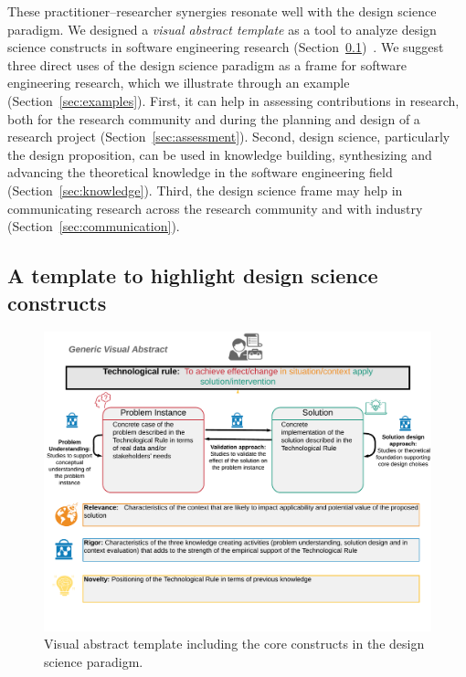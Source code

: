 \documentclass[graybox]{svmult}
\begin{document}
These practitioner--researcher synergies resonate well with the design science paradigm.  We designed a \emph{visual abstract template} as a tool to analyze design science constructs in software engineering research  (Section~\ref{sec:VA_template})~\cite{StoreyESEM17}. We suggest three direct uses of the design science paradigm as a frame for software engineering research, which we illustrate through an example (Section~\ref{sec:examples}). First, it can help in assessing contributions in research, both for the research community and during the planning and design of a research project (Section~\ref{sec:assessment}). Second, design science, particularly the design proposition, can be used in knowledge building, synthesizing and advancing the theoretical knowledge in the software engineering field (Section~\ref{sec:knowledge}). Third, the design science frame may help in communicating research across the research community and with industry (Section~\ref{sec:communication}). 


\subsection{A template to highlight design science constructs}%
\label{sec:VA_template}

\begin{figure}[t]
\includegraphics[width=1.0\textwidth, trim={0 15mm 0 0},clip]{Figures/GenericVA.png}
\caption{Visual abstract template including the core constructs in the design science paradigm.}
\label{fig:VA-template}      
\end{figure}
\end{document}
